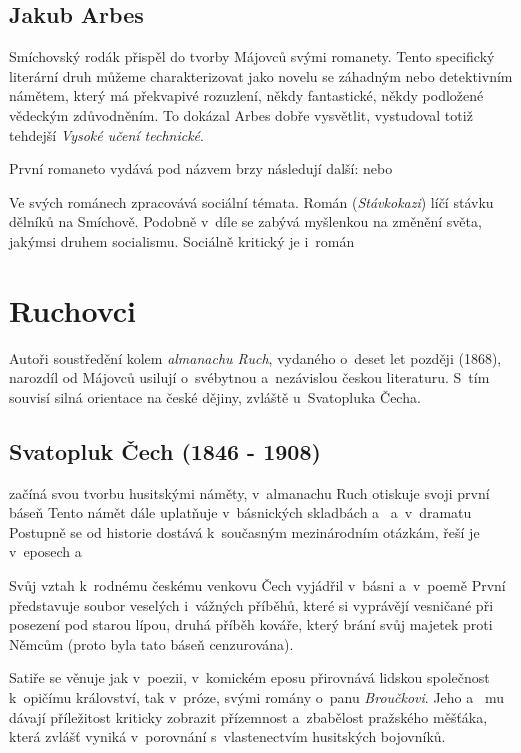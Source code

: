 \subsection*{Jakub Arbes}
Smíchovský rodák  přispěl do tvorby Májovců svými
romanety. Tento specifický literární druh můžeme charakterizovat jako
novelu se záhadným nebo detektivním námětem, který má překvapivé
rozuzlení, někdy fantastické, někdy podložené vědeckým zdůvodněním. To
dokázal Arbes dobře vysvětlit, vystudoval totiž tehdejší \emph{Vysoké
učení technické}.

První romaneto vydává pod názvem  brzy následují
další:   
nebo 

Ve svých románech zpracovává sociální témata. Román
 (\emph{Stávkokazi}) líčí stávku dělníků na
Smíchově. Podobně v~díle  se zabývá myšlenkou
na změnění světa, jakýmsi druhem socialismu. Sociálně kritický je
i~román 

\section{Ruchovci}
Autoři soustředění kolem \emph{almanachu Ruch}, vydaného o~deset let
později (1868), narozdíl od Májovců usilují o~svébytnou a~nezávislou
českou literaturu. S~tím souvisí silná orientace na české dějiny,
zvláště u~Svatopluka Čecha.

\subsection*{Svatopluk Čech (1846 - 1908)}
 začíná svou tvorbu husitskými náměty, v~almanachu
Ruch otiskuje svoji první báseň  Tento námět dále
uplatňuje v~básnických skladbách  a~
a~v~dramatu  Postupně se od historie dostává
k~současným mezinárodním otázkám, řeší je v~eposech 
a~ 

Svůj vztah k~rodnému českému venkovu Čech vyjádřil v~básni 
a~v~poemě  První představuje soubor veselých i~vážných
příběhů, které si vyprávějí vesničané při posezení pod starou lípou,
druhá příběh kováře, který brání svůj majetek proti Němcům (proto byla
tato báseň cenzurována).

Satiře se věnuje jak v~poezii, v~komickém eposu 
přirovnává lidskou společnost k~opičímu království, tak v~próze, svými
romány o~panu \emph{Broučkovi}. Jeho 
a~ 
mu dávají příležitost kriticky zobrazit přízemnost a~zbabělost pražského
měšťáka, která zvlášť vyniká v~porovnání s~vlastenectvím husitských
bojovníků.


